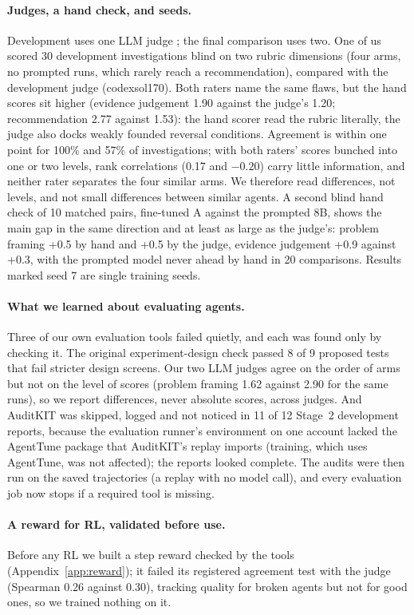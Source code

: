 \documentclass[11pt]{article}
\begin{document}
\paragraph{Judges, a hand check, and seeds.} Development uses one LLM judge \citep{zheng2023judging}; the final
comparison uses two. One of us scored 30 development investigations blind on two rubric dimensions (four arms, no
prompted runs, which rarely reach a recommendation), compared with the development judge (codexsol170). Both raters name the same flaws, but the hand scores sit higher
(evidence judgement 1.90 against the judge's 1.20; recommendation 2.77 against 1.53): the hand scorer read the rubric
literally, the judge also docks weakly founded reversal conditions. Agreement is within one point for 100\% and 57\%
of investigations; with both raters' scores bunched into one or two levels, rank correlations (0.17 and $-0.20$) carry
little information, and neither rater separates the four similar arms. We therefore read differences, not levels, and
not small differences between similar agents. A second blind hand check of 10 matched pairs, fine-tuned A
against the prompted 8B, shows the main gap in the same direction and at least as large as the judge's: problem
framing +0.5 by hand and +0.5 by the judge, evidence judgement +0.9 against +0.3, with the prompted model never ahead
by hand in 20 comparisons.
Results marked seed 7 are single training seeds.

\paragraph{What we learned about evaluating agents.} Three of our own evaluation tools failed quietly, and each was
found only by checking it. The original experiment-design check passed 8 of 9 proposed tests that fail stricter design
screens. Our two LLM judges agree on the order of arms but not on the level of scores (problem framing 1.62 against
2.90 for the same runs), so we report differences, never absolute scores, across judges. And AuditKIT was skipped,
logged and not noticed in 11 of 12 Stage~2 development reports, because the evaluation runner's environment on one
account lacked the AgentTune package that AuditKIT's replay imports (training, which uses AgentTune, was not
affected); the reports looked complete. The audits were then run on the saved trajectories (a replay with no model
call), and every evaluation job now stops if a required tool is missing.

\paragraph{A reward for RL, validated before use.} Before any RL we built a step reward checked by the tools (Appendix~\ref{app:reward}); it failed its registered agreement test with the judge (Spearman 0.26 against 0.30), tracking quality for broken agents but not for good ones, so we trained nothing on it.
\end{document}
